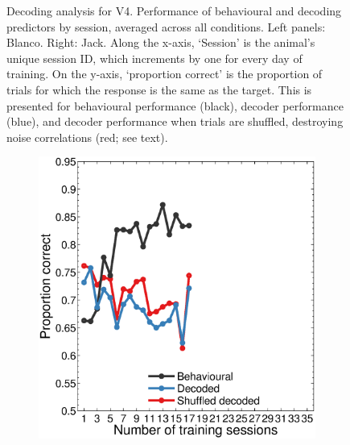 \begin{figure}[htbp]
\begin{subfigure}[b]{0.5\linewidth}
    \end{subfigure}
    \caption{%
    Decoding analysis for V4. Performance of behavioural and decoding predictors by session, averaged across all conditions.
    Left panels: Blanco. Right: Jack.
	Along the x-axis, `Session' is the animal's unique session ID, which increments by one for every day of training.
    On the y-axis, `proportion correct' is the proportion of trials for which the response is the same as the target.
    This is presented for behavioural performance (black), decoder performance (blue), and decoder performance when trials are shuffled, destroying noise correlations (red; see text).
}
    \label{fig:dec_all_v4}
\end{figure}

\begin{figure}[htbp]
    \begin{subfigure}[b]{0.5\linewidth}
        \centering
        \caption{}
        \label{fig:dec_b1_allp}
	\includegraphics[width=\linewidth]{./figures/ncl_decoding/perf_v1_blanco.eps}
    \end{subfigure}
    ~~
    \begin{subfigure}[b]{0.5\linewidth}
        \centering
        \caption{}
        \label{fig:dec_j1_allp}

\end{subfigure}
\end{figure}
